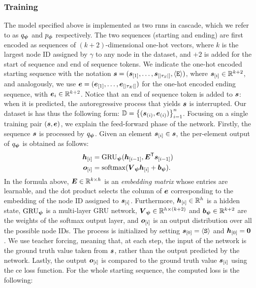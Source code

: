 \subsubsection*{Training}
The model specified above is implemented as two \glspl{rnn} in cascade, which we refer to as $q_{\boldsymbol{\psi}}$ and $p_{\boldsymbol{\phi}}$ respectively. The two sequences (starting and ending) are first encoded as sequences of $(k+2)$-dimensional one-hot vectors, where $k$ is the largest node ID assigned by $\gamma$ to any node in the dataset, and $+2$ is added for the start of sequence and end of sequence tokens. We indicate the one-hot encoded starting sequence with the notation $\Vector{s} = (\Elem{s}{1}, \ldots, \Elem{s}{|\tau_S|}, \EOS)$, where $\Elem{s}{i} \in \Real^{k+2}$, and analogously, we use $\Vector{e} = (\Elem{e}{1}, \ldots, \Elem{e}{|\tau_E|})$ for the one-hot encoded ending sequence, with $\Vector{e}_i \in \Real^{k+2}$. Notice that an end of sequence token is added to $\Vector{s}$: when it is predicted, the autoregressive process that yields $\Vector{s}$ is interrupted. Our dataset is has thus the following form: $\Data = \Set{(\Vector{s}_{(i)}, \Vector{e}_{(i)})}_{i=1}^n$. Focusing on a single training pair $(\Vector{s}, \Vector{e})$, we explain the feed-forward phase of the network. Firstly, the sequence $\Vector{s}$ is processed by $q_{\boldsymbol{\psi}}$. Given an element $\Elem{s}{i} \in \Vector{s}$, the per-element output of $q_{\boldsymbol{\psi}}$ is obtained as follows:
\begin{align*}
    \Elem{h}{i} &= \Op{GRU}_{\EncParam}(\Elem{h}{i-1}, \Matrix{E}^{\Transpose}\Elem{s}{i-1})\\
    \Elem{o}{i} &= \softmax(\Matrix{V}_{\EncParam}\Elem{h}{i} + \Vector{b}_{\EncParam}).
\end{align*}
In the formula above, $\Matrix{E} \in \Real^{k \times h}$ is an \emph{embedding matrix} whose entries are learnable, and the dot product selects the column of $\Vector{E}$ corresponding to the embedding of the node ID assigned to $\Elem{s}{i}$. Furthermore, $\Elem{h}{i} \in \Real^h$ is a hidden state, $\operatorname{GRU}_{\boldsymbol{\psi}}$ is a multi-layer GRU network, $\Matrix{V}_{\EncParam} \in \Real^{h \times (k+2)}$ and $\Vector{b}_{\EncParam} \in \Real^{k+2}$ are the weights of the softmax output layer, and $\Elem{o}{i}$ is an output distribution over all the possible node IDs. The process is initialized by setting $\Elem{s}{0} = \SOS$ and $\Elem{h}{0} = \Zeros$. We use teacher forcing, meaning that, at each step, the input of the network is the ground truth value taken from $\Vector{s}$, rather than the output predicted by the network. Lastly, the output $\Elem{o}{i}$ is compared to the ground truth value $\Elem{s}{i}$ using the \gls{ce} loss function. For the whole starting sequence, the computed loss is the following:
